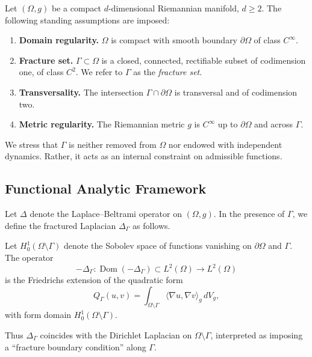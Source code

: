 Let $(\Omega,g)$ be a compact $d$-dimensional Riemannian manifold, $d\geq 2$.
The following standing assumptions are imposed:

\begin{enumerate}[label=(G\arabic*)]
  \item \textbf{Domain regularity.} $\Omega$ is compact with smooth boundary
  $\partial\Omega$ of class $C^\infty$.
  \item \textbf{Fracture set.} $\Gamma \subset \Omega$ is a closed, connected,
  rectifiable subset of codimension one, of class $C^2$. We refer to $\Gamma$
  as the \emph{fracture set}.
  \item \textbf{Transversality.} The intersection $\Gamma \cap \partial\Omega$
  is transversal and of codimension two.
  \item \textbf{Metric regularity.} The Riemannian metric $g$ is $C^\infty$ up
  to $\partial\Omega$ and across $\Gamma$.
\end{enumerate}

We stress that $\Gamma$ is neither removed from $\Omega$ nor endowed with
independent dynamics. Rather, it acts as an internal constraint on admissible
functions.

\subsection{Functional Analytic Framework}

Let $\Delta$ denote the Laplace--Beltrami operator on $(\Omega,g)$. In the
presence of $\Gamma$, we define the fractured Laplacian $\Delta_\Gamma$ as
follows.

\begin{definition}
Let $H^1_0(\Omega\setminus\Gamma)$ denote the Sobolev space of functions
vanishing on $\partial\Omega$ and $\Gamma$. The operator
\[
-\Delta_\Gamma: \operatorname{Dom}(-\Delta_\Gamma) \subset L^2(\Omega) \to L^2(\Omega)
\]
is the Friedrichs extension of the quadratic form
\[
Q_\Gamma(u,v) = \int_{\Omega\setminus\Gamma} \langle \nabla u, \nabla v \rangle_g \, dV_g,
\]
with form domain $H^1_0(\Omega\setminus\Gamma)$.
\end{definition}

Thus $\Delta_\Gamma$ coincides with the Dirichlet Laplacian on
$\Omega\setminus\Gamma$, interpreted as imposing a ``fracture boundary condition''
along $\Gamma$.

